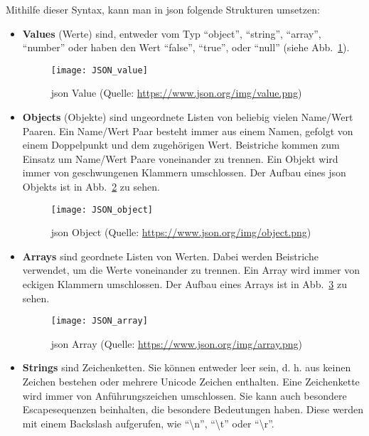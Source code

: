 Mithilfe dieser Syntax, kann man in \ac{json} folgende Strukturen umsetzen:
\begin{itemize}
	\item \textbf{Values} (\dt Werte) sind, entweder vom Typ \enquote{object}, \enquote{string}, \enquote{array}, \enquote{number} oder haben den Wert \enquote{false}, \enquote{true}, oder \enquote{null} (siehe Abb.~\ref{fig:json_value}).
	\begin{figure}[H]
		\centering
		\texttt{[image: JSON\_value]}
		\caption[\ac{json} Value (Quelle: \url{https://www.json.org/img/value.png}, Zugriff am 24.01.2024)]{\ac{json} Value (Quelle: \url{https://www.json.org/img/value.png})  \label{fig:json_value}}
	\end{figure}
	
	\item \textbf{Objects} (\dt Objekte) sind ungeordnete Listen von beliebig vielen Name/Wert Paaren. Ein Name/Wert Paar besteht immer aus einem Namen, gefolgt von einem Doppelpunkt und dem zugehörigen Wert. Beistriche kommen zum Einsatz um Name/Wert Paare voneinander zu trennen. Ein Objekt wird immer von geschwungenen Klammern umschlossen. Der Aufbau eines \ac{json} Objekts ist in Abb.~\ref{fig:json_object} zu sehen.
	
	\begin{figure}[H]
		\centering
		\texttt{[image: JSON\_object]}
		\caption[\ac{json} Object (Quelle: \url{https://www.json.org/img/object.png}, Zugriff am 24.01.2024)]{\ac{json} Object (Quelle: \url{https://www.json.org/img/object.png})  \label{fig:json_object}}
	\end{figure}
	
	\item \textbf{Arrays} sind geordnete Listen von Werten. Dabei werden Beistriche verwendet, um die Werte voneinander zu trennen. Ein Array wird immer von eckigen Klammern umschlossen. Der Aufbau eines Arrays ist in Abb.~\ref{fig:json_array} zu sehen.
	
	\begin{figure}[H]
		\centering
		\texttt{[image: JSON\_array]}
		\caption[\ac{json} Array (Quelle: \url{https://www.json.org/img/array.png}, Zugriff am 24.01.2024)]{\ac{json} Array (Quelle: \url{https://www.json.org/img/array.png})  \label{fig:json_array}}
	\end{figure}
	
	\item \textbf{Strings} sind Zeichenketten. Sie können entweder leer sein, d. h. aus keinen Zeichen bestehen oder mehrere Unicode Zeichen enthalten. Eine Zeichenkette wird immer von Anführungszeichen umschlossen. Sie kann auch besondere Escapesequenzen beinhalten, die besondere Bedeutungen haben. Diese werden mit einem Backslash aufgerufen, wie \zB \enquote{\textbackslash n}, \enquote{\textbackslash t} oder \enquote{\textbackslash r}.
	

\end{itemize}
